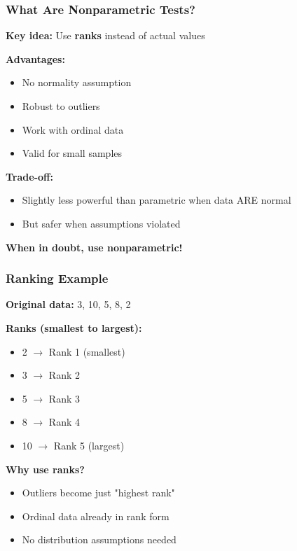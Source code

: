 \documentclass{beamer}
\begin{document}
\begin{frame}
\frametitle{What Are Nonparametric Tests?}
\textbf{Key idea:} Use \textbf{ranks} instead of actual values

\vspace{0.5cm}
\textbf{Advantages:}
\begin{itemize}
\item No normality assumption
\item Robust to outliers
\item Work with ordinal data
\item Valid for small samples
\end{itemize}

\vspace{0.5cm}
\textbf{Trade-off:}
\begin{itemize}
\item Slightly less powerful than parametric when data ARE normal
\item But safer when assumptions violated
\end{itemize}

\vspace{0.5cm}
\textbf{When in doubt, use nonparametric!}
\end{frame}

\begin{frame}
\frametitle{Ranking Example}
\textbf{Original data:} 3, 10, 5, 8, 2

\vspace{0.3cm}
\textbf{Ranks (smallest to largest):}
\begin{itemize}
\item 2 $\rightarrow$ Rank 1 (smallest)
\item 3 $\rightarrow$ Rank 2
\item 5 $\rightarrow$ Rank 3
\item 8 $\rightarrow$ Rank 4
\item 10 $\rightarrow$ Rank 5 (largest)
\end{itemize}

\vspace{0.5cm}
\textbf{Why use ranks?}
\begin{itemize}
\item Outliers become just "highest rank"
\item Ordinal data already in rank form
\item No distribution assumptions needed
\end{itemize}
\end{frame}
\end{document}
